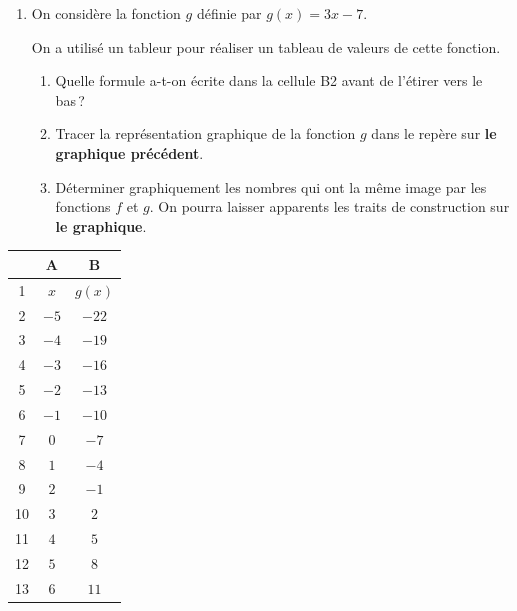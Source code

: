 \documentclass[a4paper,12pt]{article}
\begin{document}
\begin{minipage}[t]{10cm}
\begin{enumerate}[resume]
\item On considère la fonction $g$ définie par $g(x) = 3x - 7$.

On a utilisé un tableur pour réaliser un tableau de valeurs de cette fonction.
  \begin{enumerate}[label=\alph*., itemsep=3pt]
    \item Quelle formule a-t-on écrite dans la cellule B2 avant de l'étirer vers le bas\,?
    \item Tracer la représentation graphique de la fonction $g$ dans le repère sur \textbf{le graphique précédent}.
    \item Déterminer graphiquement les nombres qui ont la même image par les fonctions $f$ et $g$. On pourra laisser apparents les traits de construction sur \textbf{le graphique}.
  \end{enumerate}
\end{enumerate}
\end{minipage}\hfill
\begin{minipage}[t]{4.5cm}
\vspace{0pt}
\renewcommand{\arraystretch}{1.15}
\begin{center}
\begin{tabular}{|c|c|c|}
  \hline
     & A    & B       \\ \hline
  1  & $x$  & $g(x)$  \\ \hline
  2  & $-5$ & $-22$   \\ \hline
  3  & $-4$ & $-19$   \\ \hline
  4  & $-3$ & $-16$   \\ \hline
  5  & $-2$ & $-13$   \\ \hline
  6  & $-1$ & $-10$   \\ \hline
  7  & $0$  & $-7$    \\ \hline
  8  & $1$  & $-4$    \\ \hline
  9  & $2$  & $-1$    \\ \hline
  10 & $3$  & $2$     \\ \hline
  11 & $4$  & $5$     \\ \hline
  12 & $5$  & $8$     \\ \hline
  13 & $6$  & $11$    \\ \hline
\end{tabular}
\end{center}
\end{minipage}
\end{document}
